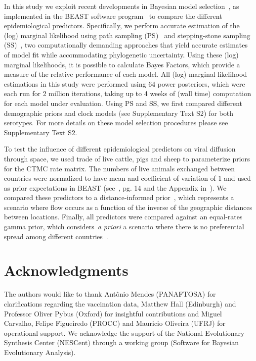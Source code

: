 \documentclass[10pt]{article}
\begin{document}
In this study we exploit recent developments in Bayesian model selection~\cite{Baele2012, Baele2013a, Baele2013b, Baele2013c}, as implemented in the BEAST software program~\cite{beast2012} to compare the different epidemiological predictors.
Specifically, we perform accurate estimation of the (log) marginal likelihood using path sampling (PS)~\cite{LartillotPhilippe} and stepping-stone sampling (SS)~\cite{Xie}, two computationally demanding approaches that yield accurate estimates of model fit while accommodating phylogenetic uncertainty.
Using these (log) marginal likelihoods, it is possible to calculate Bayes Factors, which provide a measure of the relative performance of each model. 
All (log) marginal likelihood estimations in this study were performed using 64 power posteriors, which were each run for 2 million iterations, taking up to 4 weeks of (wall time) computation for each model under evaluation. 
Using PS and SS, we first compared different demographic priors and clock models (see Supplementary Text S2) for both serotypes. 
For more details on these model selection procedures please see Supplementary Text S2.

To test the influence of different epidemiological predictors on viral diffusion through space, we used trade of live cattle, pigs and sheep to parameterize priors for the CTMC rate matrix.
The numbers of live animals exchanged between countries were normalized to have mean and coefficient of variation of $1$ and used as prior expectations in BEAST (see~\cite{roots}, pg. 14 and the Appendix in~\cite{Carvalho2013}).  
We compared these predictors to a distance-informed prior~\cite{roots}, which represents a scenario where flow occurs as a function of the inverse of the geographic distances between locations.
Finally, all predictors were compared against an equal-rates gamma prior, which considers~\textit{a priori} a scenario where there is no preferential spread among different countries~\cite{Nelson2011}.

\section*{Acknowledgments}
The authors would like to thank Ant\^onio Mendes (PANAFTOSA) for clarifications regarding the vaccination data, Matthew Hall (Edinburgh) and Professor Oliver Pybus (Oxford) for insightful contributions and Miguel Carvalho, Felipe Figueiredo (PROCC) and Mauricio Oliveira (UFRJ) for operational support.
We acknowledge the support of the National Evolutionary Synthesis Center (NESCent) through a working group (Software for Bayesian Evolutionary Analysis).
\end{document}
